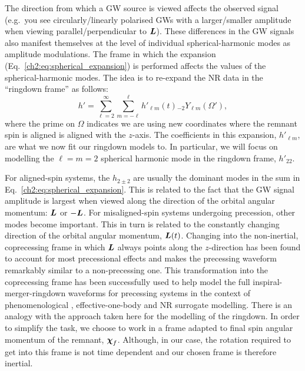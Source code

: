 The direction from which a GW source is viewed affects the observed signal 
(e.g.\ you see circularly/linearly polarised GWs with a larger/smaller amplitude when viewing parallel/perpendicular to $\vb*{L}$).
These differences in the GW signals also manifest themselves at the level of individual spherical-harmonic modes as amplitude modulations. 
The frame in which the expansion (Eq.~\ref{ch2:eq:spherical_expansion}) is performed affects the values of the spherical-harmonic modes. 
The idea is to re-expand the NR data in the ``ringdown frame'' as follows:
\begin{equation}\label{hprimedecomp}
    h' = \sum_{\ell = 2}^\infty \sum_{m = -\ell}^\ell h'_{\ell m}(t) {}_{-2}Y_{\ell m}(\Omega'),
\end{equation}
where the prime on $\Omega$ indicates we are using new coordinates where the remnant spin is aligned is aligned with the $z$-axis.
The coefficients in this expansion, $h'_{\ell m}$, are what we now fit our ringdown models to. 
In particular, we will focus on modelling the $\ell = m = 2$ spherical harmonic mode in the ringdown frame, $h'_{22}$.

For aligned-spin systems, the $h_{2\pm2}$ are usually the dominant modes in the sum in Eq.~\ref{ch2:eq:spherical_expansion}. This is related to the fact that the GW signal amplitude is largest when viewed along the direction of the orbital angular momentum: $\vb*{L}$ or $-\vb*{L}$. For misaligned-spin systems undergoing precession, other modes become important. This in turn is related to the constantly changing direction of the orbital angular momentum, $\vb*{L}(t)$.
Changing into the non-inertial, coprecessing frame in which $\vb*{L}$ always points along the $z$-direction has been found to account for most precessional effects and makes the precessing waveform remarkably similar to a non-precessing one.
This transformation into the coprecessing frame has been successfully used to help model the full inspiral-merger-ringdown waveforms for precessing systems \cite{Schmidt:2010it,Schmidt:2012rh} in the context of phenomenological \cite{Hannam:2013oca, Khan:2018fmp, Pratten:2020ceb}, effective-one-body \cite{Pan:2013rra, Ossokine:2020kjp} and NR surrogate \cite{Blackman:2017dfb, Blackman:2017pcm, Varma:2019csw} modelling.
There is an analogy with the approach taken here for the modelling of the ringdown. In order to simplify the task, we choose to work in a frame adapted to final spin angular momentum of the remnant, $\vb*{\chi}_f$.
Although, in our case, the rotation required to get into this frame is not time dependent and our chosen frame is therefore inertial.

